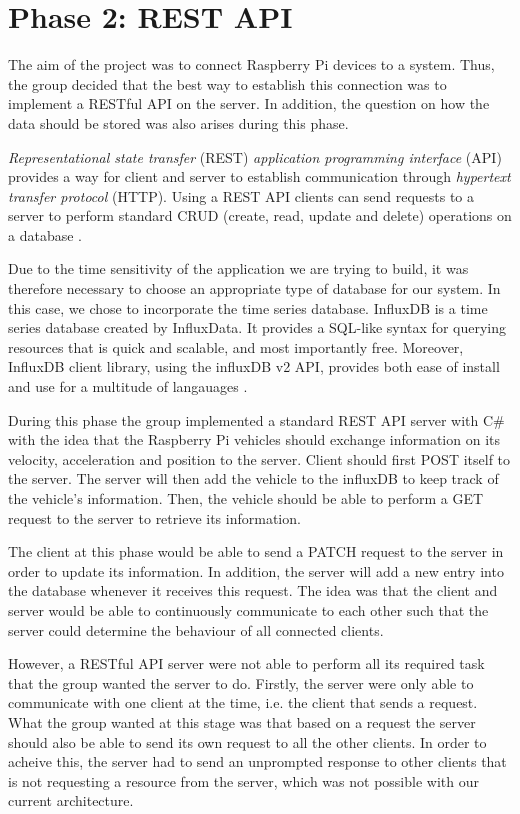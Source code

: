 \section{Phase 2: REST API}\label{phase2}
The aim of the project was to connect Raspberry Pi devices to a system. Thus, the group decided that the best way to establish this connection was to implement a RESTful API on the server. In addition, the question on how the data should be stored was also arises during this phase.

\emph{Representational state transfer} (REST) \emph{application programming interface} (API) provides a way for client and server to establish communication through \emph{hypertext transfer protocol} (HTTP). Using a REST API clients can send requests to a server to perform standard CRUD (create, read, update and delete) operations on a database \parencite{rest_api}.

Due to the time sensitivity of the application we are trying to build, it was therefore necessary to choose an appropriate type of database for our system. In this case, we chose to incorporate the time series database. InfluxDB is a time series database created by InfluxData. It provides a SQL-like syntax for querying resources that is quick and scalable, and most importantly free. Moreover, InfluxDB client library, using the influxDB v2 API, provides both ease of install and use for a multitude of langauages \parencite{influxdb}.

During this phase the group implemented a standard REST API server with C\# with the idea that the Raspberry Pi vehicles should exchange information on its velocity, acceleration and position to the server. Client should first POST itself to the server. The server will then add the vehicle to the influxDB to keep track of the vehicle's information. Then, the vehicle should be able to perform a GET request to the server to retrieve its information.

The client at this phase would be able to send a PATCH request to the server in order to update its information. In addition, the server will add a new entry into the database whenever it receives this request. The idea was that the client and server would be able to continuously communicate to each other such that the server could determine the behaviour of all connected clients.

However, a RESTful API server were not able to perform all its required task that the group wanted the server to do. Firstly, the server were only able to communicate with one client at the time, i.e. the client that sends a request. What the group wanted at this stage was that based on a request the server should also be able to send its own request to all the other clients. In order to acheive this, the server had to send an unprompted response to other clients that is not requesting a resource from the server, which was not possible with our current architecture.

